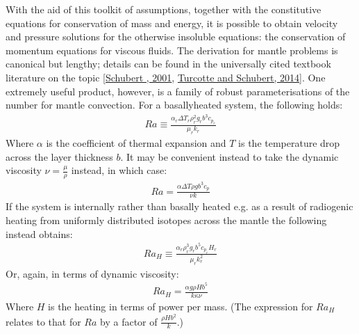 \documentclass[letterpaper,10pt,english]{jupyterBook}
\begin{document}
\sphinxAtStartPar
With the aid of this toolkit of assumptions, together with the constitutive equations for conservation of mass and energy, it is possible to obtain velocity and pressure solutions for the otherwise insoluble  equations: the conservation of momentum equations for viscous fluids. The derivation for mantle problems is canonical but lengthy; details can be found in the universally cited textbook literature on the topic {[}\hyperlink{cite.references:id663}{Schubert , 2001}, \hyperlink{cite.references:id664}{Turcotte and Schubert, 2014}{]}. One extremely useful product, however, is a family of robust parameterisations of the  number for mantle convection. For a basally\sphinxhyphen{}heated system, the following holds:
\begin{equation*}
\begin{split} Ra \equiv \frac{\alpha_r \Delta T_r \rho_r^2 g_r b^3 c_{p_r}}{\mu_r k_r} \end{split}
\end{equation*}
\sphinxAtStartPar
Where \(\alpha\) is the coefficient of thermal expansion and \(T\) is the temperature drop across the layer thickness \(b\). It may be convenient instead to take the dynamic viscosity \(\nu=\frac{\mu}{\rho}\) instead, in which case:
\begin{equation*}
\begin{split} Ra = \frac{\alpha \Delta T \rho g b^3 c_p}{\nu k} \end{split}
\end{equation*}
\sphinxAtStartPar
If the system is internally rather than basally heated \sphinxhyphen{} e.g. as a result of radiogenic heating from uniformly distributed isotopes across the mantle \sphinxhyphen{} the following instead obtains:
\begin{equation*}
\begin{split} Ra_H \equiv \frac{\alpha_r \rho_r^3 g_r b^5 c_{p_r} H_r}{\mu_r k_r^2} \end{split}
\end{equation*}
\sphinxAtStartPar
Or, again, in terms of dynamic viscosity:
\begin{equation*}
\begin{split} Ra_H = \frac{\alpha g \rho H b^5}{k \kappa \nu} \end{split}
\end{equation*}
\sphinxAtStartPar
Where \(H\) is the heating in terms of power per mass. (The expression for \(Ra_H\) relates to that for \(Ra\) by a factor of \(\frac{\rho H b^2}{k}\).)
\end{document}
